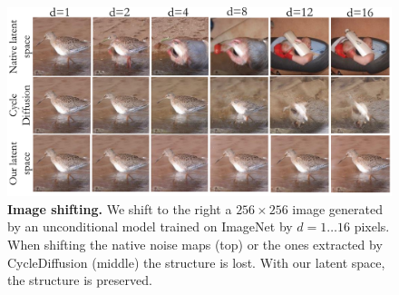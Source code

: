 \begin{figure}
\centering
\includegraphics[width=\columnwidth]{ICCV23_submission/figures/shifting.pdf}
\caption{\textbf{Image shifting.} We shift to the right a $256 \times 256$ image generated by an unconditional model trained on ImageNet by $d=1\ldots16$ pixels. When shifting the native noise maps (top) or the ones extracted by CycleDiffusion \cite{Wu22} (middle) the structure is lost. With our latent space, the structure is preserved.}
\label{fig:shifting_bird}
\end{figure}






